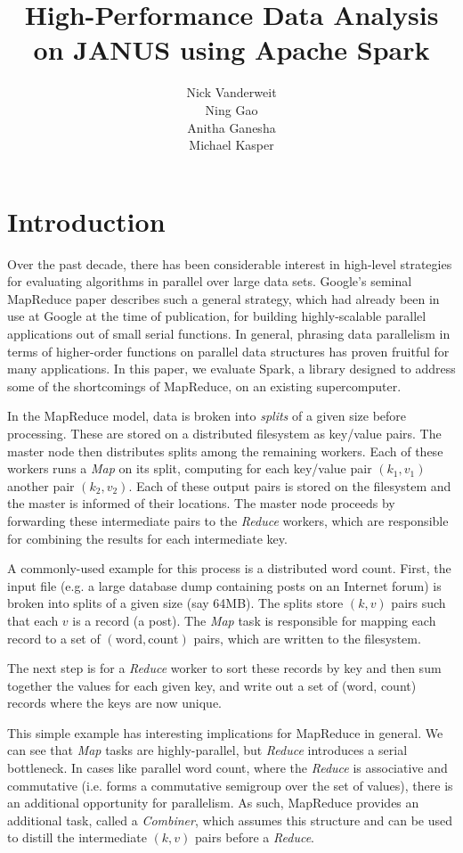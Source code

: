 \documentclass{article}
\title{High-Performance Data Analysis on JANUS using Apache Spark}
\author{Nick Vanderweit \\
        Ning Gao \\
        Anitha Ganesha \\
        Michael Kasper}
\begin{document}
\maketitle

\section{Introduction}
Over the past decade, there has been considerable interest in high-level
strategies for evaluating algorithms in parallel over large data sets.
Google's seminal MapReduce paper \citep{dean-mapreduce} describes such a
general strategy, which had already been in use at Google at the time of
publication, for building highly-scalable parallel applications out of small
serial functions. In general, phrasing data parallelism in terms of
higher-order functions on parallel data structures has proven fruitful
for many applications. In this paper, we evaluate Spark, a library
designed to address some of the shortcomings of MapReduce, on an existing
supercomputer.

In the MapReduce model, data is broken into \emph{splits} of a given size
before processing. These are stored on a distributed filesystem as key/value
pairs. The master node then distributes splits among the remaining workers.
Each of these workers runs a \emph{Map} on its split, computing for each
key/value pair $(k_1, v_1)$ another pair $(k_2, v_2)$. Each of these output
pairs is stored on the filesystem and the master is informed of their
locations. The master node proceeds by forwarding these intermediate pairs to the
\emph{Reduce} workers, which are responsible for combining the results for each
intermediate key.

A commonly-used example for this process is a distributed word count. First,
the input file (e.g. a large database dump containing posts on an Internet
forum) is broken into splits of a given size (say 64MB). The splits store
$(k, v)$ pairs such that each $v$ is a record (a post). The \emph{Map} task
is responsible for mapping each record to a set of $(\mbox{word}, \mbox{count})$
pairs, which are written to the filesystem.

The next step is for a \emph{Reduce} worker to sort these records by key
and then sum together the values for each given key, and write out
a set of (word, count) records where the keys are now unique.

This simple example has interesting implications for MapReduce in general.
We can see that \emph{Map} tasks are highly-parallel, but \emph{Reduce}
introduces a serial bottleneck. In cases like parallel word count, where the
\emph{Reduce} is associative and commutative (i.e. forms a commutative
semigroup over the set of values), there is an additional opportunity for
parallelism. As such, MapReduce provides an additional task, called a
\emph{Combiner}, which assumes this structure and can be used to distill
the intermediate $(k, v)$ pairs before a \emph{Reduce}.
\end{document}
